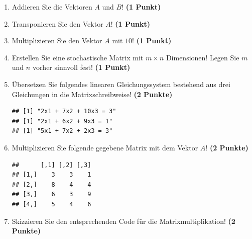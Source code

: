 \documentclass[a4paper, 10pt]{scrartcl}\usepackage[]{graphicx}\usepackage[]{xcolor}
\makeatletter
\newenvironment{kframe}{%
 \def\at@end@of@kframe{}%
 \ifinner\ifhmode%
  \def\at@end@of@kframe{\end{minipage}}%
  \begin{minipage}{\columnwidth}%
 \fi\fi%
 \def\FrameCommand##1{\hskip\@totalleftmargin \hskip-\fboxsep
 \colorbox{shadecolor}{##1}\hskip-\fboxsep
     \hskip-\linewidth \hskip-\@totalleftmargin \hskip\columnwidth}%
 \MakeFramed {\advance\hsize-\width
   \@totalleftmargin\z@ \linewidth\hsize
   \@setminipage}}%
 {\par\unskip\endMakeFramed%
 \at@end@of@kframe}
\newenvironment{knitrout}{}{} %
\makeatother
\begin{document}
\begin{enumerate}
\item Addieren Sie die Vektoren $A$ und $B$! \textbf{(1 Punkt)}
\item Transponieren Sie den Vektor $A$!
  \textbf{(1 Punkt)} 
\item Multiplizieren Sie den Vektor $A$ mit
  $10$! \textbf{(1 Punkt)}
\item Erstellen Sie eine stochastische Matrix mit $m \times n$ Dimensionen!
  Legen Sie $m$ und $n$ vorher sinnvoll fest! \textbf{(1 Punkt)}
\item {\"U}bersetzen Sie folgendes linearen Gleichungssystem bestehend aus drei
  Gleichungen in die Matrixschreibweise! \textbf{(2 Punkte)}
\begin{knitrout}
\color{fgcolor}\begin{kframe}
\begin{verbatim}
## [1] "2x1 + 7x2 + 10x3 = 3"
## [1] "2x1 + 6x2 + 9x3 = 1"
## [1] "5x1 + 7x2 + 2x3 = 3"
\end{verbatim}
\end{kframe}
\end{knitrout}
\item Multiplizieren Sie folgende gegebene Matrix mit dem Vektor $A$!
  \textbf{(2 Punkte)}
\begin{knitrout}
\color{fgcolor}\begin{kframe}
\begin{verbatim}
##      [,1] [,2] [,3]
## [1,]    3    3    1
## [2,]    8    4    4
## [3,]    6    3    9
## [4,]    5    4    6
\end{verbatim}
\end{kframe}
\end{knitrout}
\item Skizzieren Sie den entsprechenden \Rlogo Code f{\"u}r die
  Matrixmultiplikation! \textbf{(2 Punkte)}
\end{enumerate}

\clearpage\null

 
\clearpage
\end{document}
